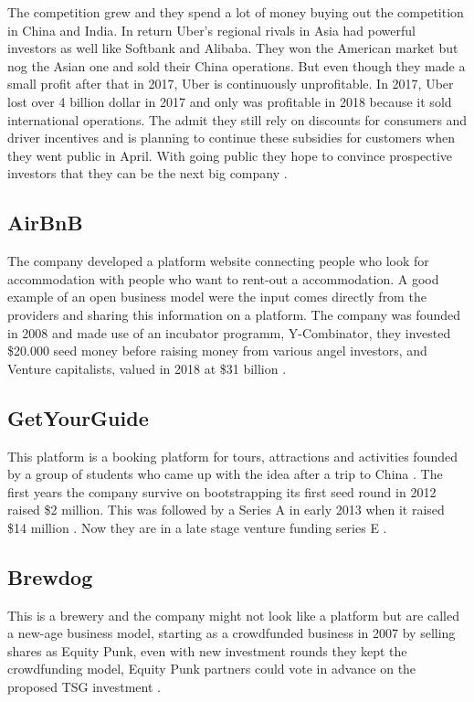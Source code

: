 \documentclass[a4paper, 11pt]{article}
\begin{document}
The competition grew and they spend a lot of money buying out the competition in China and India. In return Uber’s regional rivals in Asia had powerful investors as well like Softbank and Alibaba. They won the American market but nog the Asian one and sold their China operations. But even though they made a small profit after that in 2017, Uber is continuously unprofitable. In 2017, Uber lost over 4 billion dollar in 2017 and only was profitable in 2018 because it sold international operations. The admit they still rely on discounts for consumers and driver incentives and is planning to continue these subsidies for customers when they went public in April. With going public they hope to convince prospective investors that they can be the next big company \cite{griswold}.

\subsection{AirBnB}
The company developed a platform website connecting people who look for accommodation with people who want to rent-out a accommodation. A good example of an open business model were the input comes directly from the providers and sharing this information on a platform. The company was founded in 2008 and made use of an incubator programm, Y-Combinator, they invested \$20.000 seed money before raising money from various angel investors, and Venture capitalists, valued in 2018 at \$31 billion \citep{mazzarini}.

\subsection{GetYourGuide}
This platform is a booking platform for tours, attractions and activities founded by a group of students who came up with the idea after a trip to China \citep{getyourguide}. The first years the company survive on bootstrapping its first seed round in 2012 raised \$2 million. This was followed by a Series A in early 2013 when it raised \$14 million \cite{webintravel}. Now they are in a late stage venture funding series E \citep{crunch}.

\subsection{Brewdog}
This is a brewery and the company might not look like a platform but are called a new-age business model, starting as a crowdfunded business in 2007 by selling shares as Equity Punk, even with new investment rounds they kept the crowdfunding model, Equity Punk partners could vote in advance on the proposed TSG investment \citep{danziger}.
\end{document}
